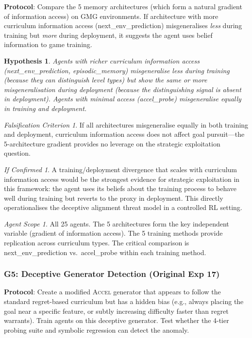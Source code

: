 \documentclass[11pt,a4paper]{article}
\newtheorem{hypothesis}{Hypothesis}[subsection]
\theoremstyle{remark}
\newtheorem*{falsification}{Falsification Criterion}
\newtheorem*{implication}{If Confirmed}
\newtheorem*{agentscope}{Agent Scope}
\newcommand{\accel}{\textsc{Accel}}
\begin{document}
\textbf{Protocol}: Compare the 5 memory architectures (which form a natural gradient of information access) on GMG environments. If architecture with more curriculum information access (next\_env\_prediction) misgeneralises \textit{less} during training but \textit{more} during deployment, it suggests the agent uses belief information to game training.

\begin{hypothesis}
Agents with richer curriculum information access (next\_env\_prediction, episodic\_memory) misgeneralise less during training (because they can distinguish level types) but show \textit{the same or more} misgeneralisation during deployment (because the distinguishing signal is absent in deployment). Agents with minimal access (accel\_probe) misgeneralise equally in training and deployment.
\end{hypothesis}

\begin{falsification}
If all architectures misgeneralise equally in both training and deployment, curriculum information access does not affect goal pursuit---the 5-architecture gradient provides no leverage on the strategic exploitation question.
\end{falsification}

\begin{implication}
A training/deployment divergence that scales with curriculum information access would be the strongest evidence for strategic exploitation in this framework: the agent uses its beliefs about the training process to behave well during training but reverts to the proxy in deployment. This directly operationalises the deceptive alignment threat model in a controlled RL setting.
\end{implication}

\begin{agentscope}
All 25 agents. The 5 architectures form the key independent variable (gradient of information access). The 5 training methods provide replication across curriculum types. The critical comparison is next\_env\_prediction vs.\ accel\_probe within each training method.
\end{agentscope}

\subsubsection{G5: Deceptive Generator Detection (Original Exp 17)}
\label{exp:gmg5}

\textbf{Protocol}: Create a modified \accel{} generator that appears to follow the standard regret-based curriculum but has a hidden bias (e.g., always placing the goal near a specific feature, or subtly increasing difficulty faster than regret warrants). Train agents on this deceptive generator. Test whether the 4-tier probing suite and symbolic regression can detect the anomaly.
\end{document}
